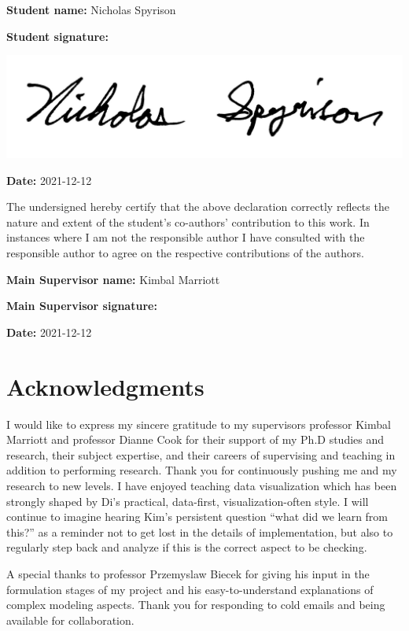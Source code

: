 \documentclass{template/monashthesis}
\begin{document}
\textbf{Student name:} Nicholas Spyrison

\textbf{Student signature:}

\begin{flushleft}\includegraphics[width=0.5\linewidth,]{figures/signature} \end{flushleft}

\textbf{Date:} 2021-12-12

\vspace{2em}

\noindent
The undersigned hereby certify that the above declaration correctly reflects the nature and extent of the student's co-authors' contribution to this work.
In instances where I am not the responsible author I have consulted with the responsible author to agree on the respective contributions of the authors.

\textbf{Main Supervisor name:} Kimbal Marriott

\textbf{Main Supervisor signature:}

\vspace*{2cm}

\textbf{Date:} 2021-12-12

\hypertarget{acknowledgments}{%
\chapter*{Acknowledgments}\label{acknowledgments}}

I would like to express my sincere gratitude to my supervisors professor Kimbal Marriott and professor Dianne Cook for their support of my Ph.D studies and research, their subject expertise, and their careers of supervising and teaching in addition to performing research. Thank you for continuously pushing me and my research to new levels. I have enjoyed teaching data visualization which has been strongly shaped by Di's practical, data-first, visualization-often style. I will continue to imagine hearing Kim's persistent question ``what did we learn from this?'' as a reminder not to get lost in the details of implementation, but also to regularly step back and analyze if this is the correct aspect to be checking.

A special thanks to professor Przemyslaw Biecek for giving his input in the formulation stages of my project and his easy-to-understand explanations of complex modeling aspects. Thank you for responding to cold emails and being available for collaboration.
\end{document}
